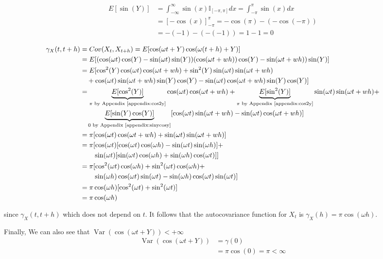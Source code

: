 \documentclass{article}
\DeclareMathOperator{\Var}{Var}
\begin{document}
\begin{align*}
E[\sin(Y)] &= \int_{-\infty}^{\infty} \sin(x) \mathbb{I}_{[-\pi, \pi]} dx = \int_{-\pi}^{\pi} \sin(x) dx\\
& = [-\cos(x)]^{\pi}_{-\pi} = -\cos(\pi) - (- \cos(-\pi)) \\
& = -(-1) - ( - (-1)) = 1 - 1 = 0
\end{align*}


\begin{align*}
\gamma_X(t,t + h) &= Cov(X_{t}, X_{t + h}) = E[\cos(\omega t + Y)\cos(\omega (t+h) + Y)] \\
 &= E[(\cos(\omega t)\cos(Y) - \sin(\omega t)\sin(Y))(\cos(\omega t + wh))\cos(Y) - \sin(\omega t + wh))\sin(Y)] \\
 &= E[\cos^2(Y)\cos(\omega t)\cos(\omega t + wh) + \sin^2(Y)\sin(\omega t)\sin(\omega t + wh)\\
 & \quad + \cos(\omega t)\sin(\omega t + wh)\sin(Y)\cos(Y) - \sin(\omega t)\cos(\omega t + wh)\sin(Y)\cos(Y)]\\
 & = \underbrace{E[\cos^2(Y)]}_{\pi \text{ by Appendix \ref{appendix:cos2y}}} \cos(\omega t)\cos(\omega t + wh) + \underbrace{E[\sin^2(Y)]}_{\pi \text{ by Appendix \ref{appendix:cos2y}}} \sin(\omega t)\sin(\omega t + wh) +\\
 & \quad \underbrace{E[\sin(Y)\cos(Y)]}_{\text{0 by Appendix \ref{appendix:sinycosy}}} [\cos(\omega t)\sin(\omega t + wh) - \sin(\omega t)\cos(\omega t + wh)]\\
 &= \pi [\cos(\omega t)\cos(\omega t + wh) + \sin(\omega t)\sin(\omega t + wh)]\\
 &= \pi [
 \cos(\omega t)[\cos(\omega t) \cos(\omega h) - \sin(\omega t) \sin(\omega h)] +\\
 &\qquad \sin(\omega t)[\sin(\omega t) \cos(\omega h) + \sin(\omega h) \cos(\omega t)]]\\
 &= \pi [
  \cos^2(\omega t) \cos(\omega h) + \sin^2(\omega t) \cos(\omega h) +\\
  &\qquad \sin(\omega h)\cos(\omega t)\sin(\omega t) - \sin(\omega h)\cos(\omega t)\sin(\omega t)
 ]\\
 &= \pi \cos(\omega h) [\cos^2(\omega t) + \sin^2(\omega t)]\\
 &= \pi \cos(\omega h)
 \end{align*}

 since $\gamma_X(t,t + h)$ which does not depend on $t$.
 It follows that the autocovariance function for $X_t$ is $\gamma_X(h) = \pi \cos(\omega h)$.

 Finally, We can also see that $\Var(\cos(\omega t + Y)) < +\infty$
 \begin{align*}
 \Var(\cos(\omega t + Y)) &= \gamma(0) \\
 &= \pi \cos(0) = \pi < \infty
 \end{align*}
\end{document}
